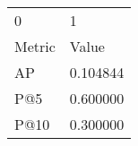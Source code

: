 \begin{tabular}{ll}
0 & 1 \\
Metric & Value \\
AP & 0.104844 \\
P@5 & 0.600000 \\
P@10 & 0.300000 \\
\end{tabular}
